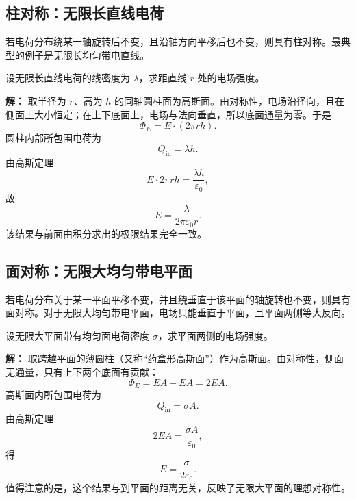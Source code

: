 \subsection*{柱对称：无限长直线电荷}

若电荷分布绕某一轴旋转后不变，且沿轴方向平移后也不变，则具有柱对称。最典型的例子是无限长均匀带电直线。

\begin{example}[无限长直线电荷的电场]
设无限长直线电荷的线密度为 $\lambda$，求距直线 $r$ 处的电场强度。

\textbf{解：} 取半径为 $r$、高为 $h$ 的同轴圆柱面为高斯面。由对称性，电场沿径向，且在侧面上大小恒定；在上下底面上，电场与法向垂直，所以底面通量为零。于是
\begin{equation}
\Phi_E = E\cdot (2\pi r h).
\end{equation}
圆柱内部所包围电荷为
\begin{equation}
Q_{\text{in}} = \lambda h.
\end{equation}
由高斯定理
\begin{equation}
E\cdot 2\pi r h = \frac{\lambda h}{\varepsilon_0},
\end{equation}
故
\begin{equation}
E = \frac{\lambda}{2\pi\varepsilon_0 r}.
\end{equation}
该结果与前面由积分求出的极限结果完全一致。
\end{example}

\subsection*{面对称：无限大均匀带电平面}

若电荷分布关于某一平面平移不变，并且绕垂直于该平面的轴旋转也不变，则具有面对称。对于无限大均匀带电平面，电场只能垂直于平面，且平面两侧等大反向。

\begin{example}[无限大均匀带电平面的电场]
设无限大平面带有均匀面电荷密度 $\sigma$，求平面两侧的电场强度。

\textbf{解：} 取跨越平面的薄圆柱（又称“药盒形高斯面”）作为高斯面。由对称性，侧面无通量，只有上下两个底面有贡献：
\begin{equation}
\Phi_E = EA + EA = 2EA.
\end{equation}
高斯面内所包围电荷为
\begin{equation}
Q_{\text{in}} = \sigma A.
\end{equation}
由高斯定理
\begin{equation}
2EA = \frac{\sigma A}{\varepsilon_0},
\end{equation}
得
\begin{equation}
E = \frac{\sigma}{2\varepsilon_0}.
\end{equation}
值得注意的是，这个结果与到平面的距离无关，反映了无限大平面的理想对称性。
\end{example}

